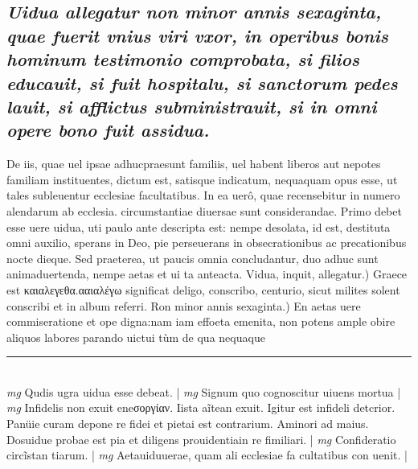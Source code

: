 \documentclass{article}
\begin{document}
\begin{pages}
\subsection*{\textit{Uidua allegatur non minor annis sexaginta, quae fuerit vnius viri vxor, in operibus bonis hominum testimonio comprobata, si filios educauit, si fuit hospitalu, si sanctorum pedes lauit, si afflictus subministrauit, si in omni opere bono fuit assidua. }}\pstart De iis, quae uel ipsae adhucpraesunt familiis, uel habent liberos aut nepotes familiam instituentes, dictum est, satisque indicatum, nequaquam opus esse, ut tales subleuentur ecclesiae facultatibus. In ea uerô, quae recensebitur in numero alendarum ab ecclesia. circumstantiae diuersae sunt considerandae. Primo debet esse uere uidua, uti paulo ante descripta est: nempe desolata, id est, destituta omni auxilio, sperans in Deo, pie perseuerans in obsecrationibus ac precationibus nocte dieque. Sed praeterea, ut paucis omnia concludantur, duo adhuc sunt animaduertenda, nempe aetas et ui ta anteacta.  \pend\pstart Vidua, inquit, allegatur.) Graece est καιαλεγεθα.ααιαλέγω significat deligo, conscribo, centurio, sicut milites solent conscribi et in album referri.  \pend\pstart Ron minor annis sexaginta.) En aetas uere commiseratione et ope digna:nam iam effoeta emenita, non potens ample obire aliquos labores parando uictui tùm de qua nequaque   \pend
\vspace{0.5cm}\noindent
\vspace{0.2cm}\rule{1cm}{0.2pt}\\ 
\hspace{0.2cm}\textit{mg}
\footnotesize Qudis ugra uidua esse debeat. 
\normalsize| 
\hspace{0.2cm}\textit{mg}
\footnotesize Signum quo cognoscitur uiuens mortua 
\normalsize| 
\hspace{0.2cm}\textit{mg}
\footnotesize Infidelis non exuit eneσοργίαν. Iista aĩtean exuit. Igitur est infideli detcrior. Panüie curam depone re fidei et pietai est contrarium. Aminori ad maius. Dosuidue probae est pia et diligens prouidentiain re fimiliari. 
\normalsize| 
\hspace{0.2cm}\textit{mg}
\footnotesize Confideratio circĩstan tiarum. 
\normalsize| 
\hspace{0.2cm}\textit{mg}
\footnotesize Aetauiduuerae, quam ali ecclesiae fa cultatibus con uenit. 
\normalsize| 

\end{pages}
\end{document}
